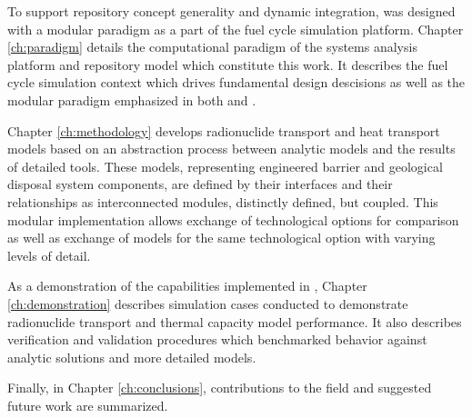 To support repository concept generality and dynamic integration, \Cyder was 
designed with a modular paradigm as a part of the \Cyclus fuel cycle simulation 
platform. Chapter \ref{ch:paradigm} details the computational paradigm of the 
\Cyclus systems analysis platform and \Cyder repository model which constitute 
this work.  It describes the \Cyclus fuel cycle simulation context which drives 
fundamental \Cyder design descisions as well as the modular paradigm emphasized 
in both \Cyclus and \Cyder. 

Chapter \ref{ch:methodology} develops  radionuclide transport and heat transport 
models based on an abstraction process between analytic models and the results 
of detailed tools.  These models, representing engineered barrier and geological 
disposal system components, are defined by their interfaces and their 
relationships as interconnected modules, distinctly defined, but coupled.  This 
modular implementation allows exchange  of technological options for comparison 
as well as exchange of models for the same technological option with varying 
levels of detail.  

As a demonstration of the capabilities implemented in \Cyder, Chapter 
\ref{ch:demonstration} describes simulation cases conducted to demonstrate 
radionuclide transport and thermal capacity model performance. It also describes 
verification and validation procedures which benchmarked \Cyder behavior against 
analytic solutions and more detailed models.  

Finally, in Chapter \ref{ch:conclusions}, contributions to the field and 
suggested future work are summarized. 




